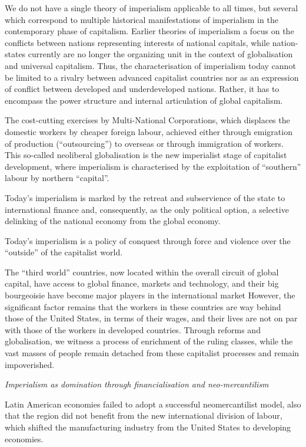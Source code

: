 \documentclass[
]{book}
\begin{document}
We do not have a single theory of imperialism applicable to all times, but several which correspond to multiple historical manifestations of imperialism in the contemporary phase of capitalism.
Earlier theories of imperialism a focus on the conflicts between nations representing interests of national capitals, while nation-states currently are no longer the organizing unit in the context of globalisation and universal capitalism. Thus, the characterisation of imperialism today cannot be limited to a rivalry between advanced capitalist countries nor as an expression of conflict between developed and underdeveloped nations. Rather, it has to encompass the power structure and internal articulation of global capitalism.

The cost-cutting exercises by Multi-National Corporations, which displaces the domestic workers by cheaper foreign labour, achieved either through emigration of production (``outsourcing'') to overseas or through immigration of workers. This so-called neoliberal globalisation is the new imperialist stage of capitalist development, where imperialism is characterised by the exploitation of ``southern'' labour by northern ``capital''.

Today's imperialism is marked by the retreat and subservience of the state to international finance and, consequently, as the only political option, a selective delinking of the national economy from the global economy.

Today's imperialism is a policy of conquest through force and violence over the ``outside'' of the capitalist world.

The ``third world'' countries, now located within the overall circuit of global capital, have access to global finance, markets and technology, and their big bourgeoisie have become major players in the international market However, the significant factor remains that the workers in these countries are way behind those of the United States, in terms of their wages, and their lives are not on par with those of the workers in developed countries. Through reforms and globalisation, we witness a process of enrichment of the ruling classes, while the vast masses of people remain detached from these capitalist processes and remain impoverished.

\emph{Imperialism as domination through financialisation and neo-mercantilism}

Latin American economies failed to adopt a successful neomercantilist model, also that the region did not benefit from the new international division of labour, which shifted the manufacturing industry from the United States to developing economies.
\end{document}
